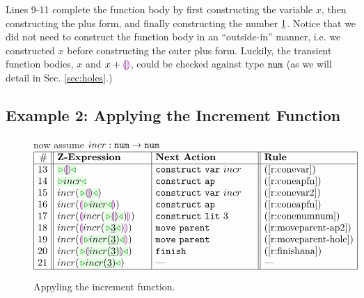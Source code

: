 Lines 9-11 complete the function body by first constructing the variable
$x$, then constructing the plus form, and finally constructing the number
$\underline{1}$. Notice that we did not need to construct the function body in
an ``outside-in'' manner, i.e. we constructed $x$ before constructing the
outer plus form. Luckily, the transient function bodies, $x$ and $x +
\textcolor{violet}{\llparenthesis}\textcolor{violet}{\rrparenthesis}$, could be checked against type $\texttt{num}$ (as we will detail in
Sec. \ref{sec:holes}.)

\subsection{Example 2: Applying the Increment Function}

\begin{figure}[t!]
\begin{center}
\colorbox{light-gray}{\hspace{53px} now assume $incr : \texttt{num} \rightarrow \texttt{num}$ \hspace{54px}}
$\arraycolsep=4px
\begin{array}{|r||l|l||l|l|}
\hline
\# & \textbf{Z-Expression} &
\textbf{Next Action} & \textbf{Rule}
\\
\hline
13 &
\zwsel{\hhole{}} &
\aConstruct{\fvar{incr}} \hphantom{~\,\,~~}&
\text{(\ref{r:conevar})}
\\ 14 &
\zwsel{incr} &
\aConstruct{\fap} &
\text{(\ref{r:coneapfn})}
\\ 15 &
incr(\zwsel{\hhole{}}) &
\aConstruct{\fvar{incr}} &
\text{(\ref{r:conevar2})}
\\ 16 &
incr(\hhole{\zwsel{incr}}) &
\aConstruct{\fap} &
\text{(\ref{r:coneapfn})}
\\ 17 &
incr(\hhole{incr(\zwsel{\hhole{}})}) \hphantom{~~~~} &
\aConstruct{\fnumlit{3}} &
\text{(\ref{r:conenumnum})}
\\ 18 &
incr(\hhole{incr(\zwsel{\hnum{3}})}) &
\aMove{\dParent}&
\text{(\ref{r:moveparent-ap2})}
\\ 19 &
incr(\hhole{\zwsel{incr(\hnum{3})}}) &
\aMove{\dParent} &
\text{(\ref{r:moveparent-hole})}
\\ 20 &
incr(\zwsel{\hhole{incr(\hnum{3})}})&
\aFinish &
\text{(\ref{r:finishana})}
\\ 21 &
incr(\zwsel{incr(\hnum{3})}) &
\textrm{---} &
{\textrm{---}}
\\ \hline
\end{array}
$\end{center}\vspace{-6px}
\caption{Appyling the increment function.}
\label{fig:second-example}
\end{figure}

